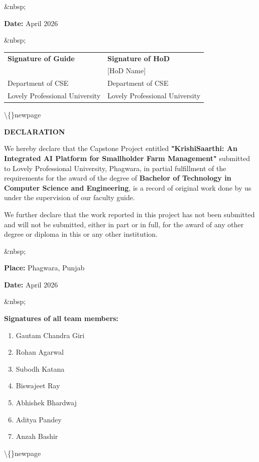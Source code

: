 \documentclass[12pt, a4paper]{report}
\begin{document}
\&nbsp;

\textbf{Date:} April 2026

\&nbsp;

\begin{table}[htbp]
\centering
\small
\begin{tabularx}{\textwidth}{|X|X|}
\hline
 &  \\
\hline
\textbf{Signature of Guide} & \textbf{Signature of HoD} \\
[Faculty Name] & [HoD Name] \\
Department of CSE & Department of CSE \\
Lovely Professional University & Lovely Professional University \\
\hline
\end{tabularx}
\end{table}

\textbackslash\{\}newpage

\begin{center}
{\fontsize{14}{17}\bfseries DECLARATION}\\
\end{center}
We hereby declare that the Capstone Project entitled \textbf{"KrishiSaarthi: An Integrated AI Platform for Smallholder Farm Management"} submitted to Lovely Professional University, Phagwara, in partial fulfillment of the requirements for the award of the degree of \textbf{Bachelor of Technology in Computer Science and Engineering}, is a record of original work done by us under the supervision of our faculty guide.

We further declare that the work reported in this project has not been submitted and will not be submitted, either in part or in full, for the award of any other degree or diploma in this or any other institution.

\&nbsp;

\textbf{Place:} Phagwara, Punjab

\textbf{Date:} April 2026

\&nbsp;

\textbf{Signatures of all team members:}

\begin{enumerate}[leftmargin=*]
  \item Gautam Chandra Giri
  \item Rohan Agarwal
  \item Subodh Katana
  \item Biswajeet Ray
  \item Abhishek Bhardwaj
  \item Aditya Pandey
  \item Anzah Bashir
\end{enumerate}
\textbackslash\{\}newpage
\end{document}
